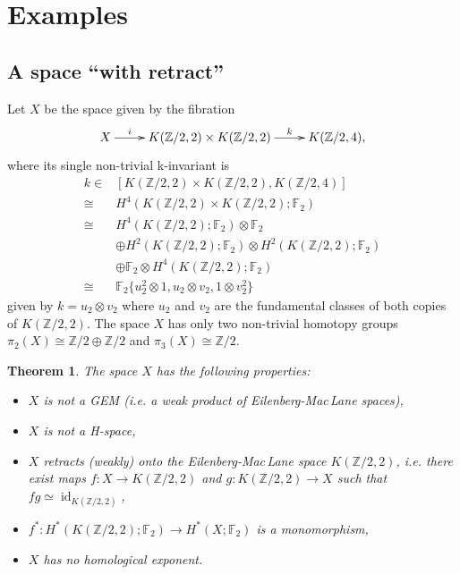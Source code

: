 \documentclass{amsart}
\newtheorem*{thm*}{Theorem}
\theoremstyle{definition}
\theoremstyle{remark}
\DeclareMathOperator{\id}{id}
\newcommand{\Z}{\mathbb{Z}}
\newcommand{\F}{\mathbb{F}}
\begin{document}
\section{Examples}\label{s:examples}

\subsection{A space ``with retract''}\label{e:retract}

Let $X$ be the space given by the fibration
$$\xymatrix{
X\ar[r]^-i &K(\Z/2,2)\times K(\Z/2,2)\ar[r]^-k &K(\Z/2,4),
}$$
where its single non-trivial k-invariant is
\begin{align*}
k \in& [K(\Z/2,2)\times K(\Z/2,2),K(\Z/2,4)]\\
\cong &H^4(K(\Z/2,2)\times K(\Z/2,2);\F_2)\\
\cong &H^4(K(\Z/2,2);\F_2)\otimes\F_2\\
&\oplus H^2(K(\Z/2,2);\F_2)\otimes H^2(K(\Z/2,2);\F_2)\\
&\oplus\F_2\otimes H^4(K(\Z/2,2);\F_2)\\
\cong &\F_2\{u_2^2\otimes1,u_2\otimes v_2,1\otimes v_2^2\}
\end{align*}
given by $k=u_2\otimes v_2$ where $u_2$ and $v_2$ are the fundamental classes of both copies of $K(\Z/2,2)$. The space $X$ has only two non-trivial homotopy groups $\pi_2(X)\cong\Z/2\oplus\Z/2$ and $\pi_3(X)\cong\Z/2$.

\newpage
\begin{thm*}
The space $X$ has the following properties:
\begin{itemize}
\item[1.]{$X$ is not a GEM (i.e. a weak product of Eilenberg-Mac\,Lane spaces),}
\item[2.]{$X$ is not a H-space,}
\item[3.]{$X$ retracts (weakly) onto the Eilenberg-Mac\,Lane space $K(\Z/2,2)$, i.e. there exist maps $f:X\to K(\Z/2,2)$ and $g:K(\Z/2,2)\to X$ such that $fg\simeq\id_{K(\Z/2,2)}$,}
\item[4.]{$f^*:H^*(K(\Z/2,2);\F_2)\to H^*(X;\F_2)$ is a monomorphism,}
\item[5.]{$X$ has no homological exponent.}
\end{itemize}
\end{thm*}
\end{document}

